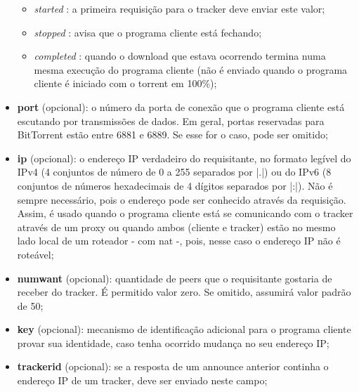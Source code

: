 \begin{itemize}
    \begin{itemize}
        \item \emph{started} : a primeira requisição para o \gls*{tracker} deve enviar
        este valor;
        \item \emph{stopped} : avisa que o programa cliente está fechando;
        \item \emph{completed} : quando o download que estava ocorrendo termina numa
        mesma execução do programa cliente (não é enviado quando o programa cliente é
        iniciado com o \gls*{torrent} em 100\%);
    \end{itemize}

    \item \textbf{port} (opcional): o número da porta de conexão que o programa cliente
    está escutando por transmissões de dados. Em geral, portas reservadas para
    BitTorrent estão entre 6881 e 6889. Se esse for o caso, pode ser omitido;

    \item \textbf{ip} (opcional): o endereço IP verdadeiro do requisitante, no formato
    legível do IPv4 (4 conjuntos de número de 0 a 255 separados por \bverb|.|) ou do
    IPv6 (8 conjuntos de números hexadecimais de 4 dígitos separados por \bverb|:|).
    Não é sempre necessário, pois o endereço pode ser conhecido através da requisição.
    Assim, é usado quando o programa cliente está se comunicando com o \gls*{tracker}
    através de um \gls{proxy} ou quando ambos (cliente e \gls*{tracker}) estão no mesmo
    lado local de um roteador - com \gls{nat} -, pois, nesse caso o endereço IP não é
    roteável;

    \item \textbf{numwant} (opcional): quantidade de \glspl*{peer} que o requisitante
    gostaria de receber do \gls*{tracker}. É permitido valor zero. Se omitido, assumirá
    valor padrão de 50;

    \item \textbf{key} (opcional): mecanismo de identificação adicional para o programa
    cliente provar sua identidade, caso tenha ocorrido mudança no seu endereço IP;

    \item \textbf{trackerid} (opcional): se a resposta de um \gls*{announce} anterior
    continha o endereço IP de um \gls*{tracker}, deve ser enviado neste campo;
\end{itemize}

{}

